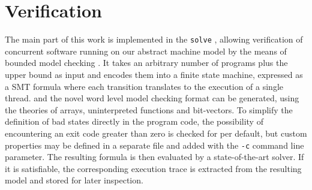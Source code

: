 \section{Verification}

The main part of this work is implemented in the \texttt{solve} ,
allowing verification of concurrent software running on our abstract machine model by the means of bounded model checking \cite{ref:BMC}.
It takes an arbitrary number of programs plus the upper bound as input and encodes them into a finite state machine, expressed as a SMT formula where each transition translates to the execution of a single thread.
{\SMTLIB} \cite{ref:SMT-Lib} and the novel {\BTOR} \cite{ref:BTOR2} word level model checking format can be generated, using the theories of arrays, uninterpreted functions and bit-vectors.
To simplify the definition of bad states directly in the program code, the possibility of encountering an exit code greater than zero is checked for per default, but custom properties may be defined in a separate file and added with the \texttt{-c} command line parameter.
The resulting formula is then evaluated by a state-of-the-art solver.
If it is satisfiable, the corresponding execution trace is extracted from the resulting model and stored for later inspection.


